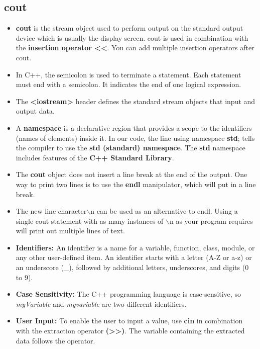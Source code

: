 \documentclass[12pt , a4paper]{article}
\newcommand{\hl}[1]{\colorbox{coolblack}{\color{cream}\textbf{#1}\color{black}}}
\newcommand{\bs}{$\backslash$}
\begin{document}
	\subsection{cout}
		\begin{itemize}
			\item \hl{cout} is the stream object used to perform output on the standard output device which is usually the display screen. cout is used in combination with the \textbf{insertion operator <<}. You can add multiple insertion operators after cout.\\
			\item In C++, the semicolon is used to terminate a statement. Each statement must end with a semicolon. It indicates the end of one logical expression.\\
			\item The \hl{<iostream>} header defines the standard stream objects that input and output data.\\
			\item A \textbf{namespace} is a declarative region that provides a scope to the identifiers (names of elements) inside it. In our code, the line using namespace \textbf{std}; tells the compiler to use the \textbf{std (standard) namespace}. The \textbf{std} namespace includes features of the \textbf{C++ 							Standard Library}.\\
			\item The \textbf{cout} object does not insert a line break at the end of the output. One way to print two lines is to use the \hl{endl} manipulator, which will put in a line break.\\
			\item The new line character\bs n can be used as an alternative to endl. Using a single cout statement with as many instances of \bs n as your program requires will print out multiple lines of text.\\
			\item \textbf{Identifiers:} An identifier is a name for a variable, function, class, module, or any other user-defined item. An identifier starts with a letter (A-Z or a-z) or an underscore (\_), followed by additional letters, underscores, and digits (0 to 9).\\
			\item \textbf{Case Sensitivity:} The C++ programming language is case-sensitive, so \textit{myVariable} and \textit{myvariable} are two different identifiers.\\
			\item \textbf{User Input:} To enable the user to input a value, use \hl{cin} in combination with the extraction operator \hl{(>>)}. The variable containing the extracted data follows the operator.\\

\end{itemize}
\end{document}
